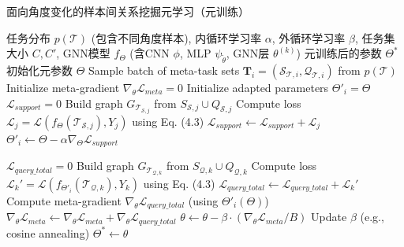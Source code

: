 \begin{algorithm}[htbp]
\caption{面向角度变化的样本间关系挖掘元学习（元训练）}
\label{alg:meta_training_angle}
\begin{algorithmic}[1]
    \REQUIRE 任务分布 $p(\mathcal{T})$ (包含不同角度样本), 内循环学习率 $\alpha$, 外循环学习率 $\beta$, 任务集大小 $C, C'$, GNN模型 $f_\Theta$ (含CNN $\phi$, MLP $\psi_{\tilde{\theta}}$, GNN层 $\theta^{(k)}$)
    \ENSURE 元训练后的参数 $\Theta^*$
    \STATE 初始化元参数 $\Theta$
        \STATE Sample batch of meta-task sets $\mathbf{T}_i = (\mathcal{S}_{\mathcal{T},i}, \mathcal{Q}_{\mathcal{T},i})$ from $p(\mathcal{T})$
        \STATE Initialize meta-gradient $\nabla_\theta \mathcal{L}_{meta} = 0$
            \STATE Initialize adapted parameters $\Theta'_i = \Theta$
            \STATE $\mathcal{L}_{support} = 0$
               \STATE Build graph $G_{\mathcal{T}_{\mathcal{S},j}}$ from $S_{\mathcal{S},j} \cup Q_{\mathcal{S},j}$
               \STATE Compute loss $\mathcal{L}_j = \mathcal{L}(f_{\Theta}(\mathcal{T}_{\mathcal{S},j}), Y_j)$ using Eq. (4.3)
               \STATE $\mathcal{L}_{support} \leftarrow \mathcal{L}_{support} + \mathcal{L}_j$
            \ENDFOR
            \STATE $\Theta'_i \leftarrow \Theta - \alpha \nabla_{\Theta} \mathcal{L}_{support}$ %

            \STATE $\mathcal{L}_{query\_total} = 0$
               \STATE Build graph $G_{\mathcal{T}_{\mathcal{Q},k}}$ from $S_{\mathcal{Q},k} \cup Q_{\mathcal{Q},k}$
               \STATE Compute loss $\mathcal{L}_k' = \mathcal{L}(f_{\Theta'_i}(\mathcal{T}_{\mathcal{Q},k}), Y_k)$ using Eq. (4.3)
               \STATE $\mathcal{L}_{query\_total} \leftarrow \mathcal{L}_{query\_total} + \mathcal{L}_k'$
            \ENDFOR
            \STATE Compute meta-gradient $\nabla_\theta \mathcal{L}_{query\_total}$ (using $\Theta'_i(\Theta)$)
            \STATE $\nabla_\theta \mathcal{L}_{meta} \leftarrow \nabla_\theta \mathcal{L}_{meta} + \nabla_\theta \mathcal{L}_{query\_total}$
        \ENDFOR
        \STATE $\theta \leftarrow \theta - \beta \cdot (\nabla_\theta \mathcal{L}_{meta} / B)$ %
        \STATE Update $\beta$ (e.g., cosine annealing)
    \ENDWHILE
    \STATE $\Theta^* \leftarrow \theta$
\end{algorithmic}
\end{algorithm}

